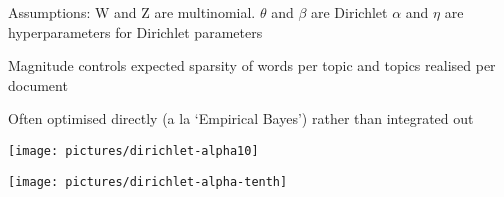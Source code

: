 \documentclass{mediumfoils}
\begin{document}
Assumptions:
\ita
\itm W and Z are multinomial.  
\itm $\theta$ and $\beta$ are Dirichlet 
\itm $\alpha$ and $\eta$ are hyperparameters for Dirichlet parameters
\ita
\item Magnitude controls expected sparsity of words per topic and topics realised per document
\item Often optimised directly (a la `Empirical Bayes') rather than integrated out
\itz
\itz


\centerline{\texttt{[image: pictures/dirichlet-alpha10]}}


\centerline{\texttt{[image: pictures/dirichlet-alpha-tenth]}}





%
%
%
%
%
%
\end{document}
